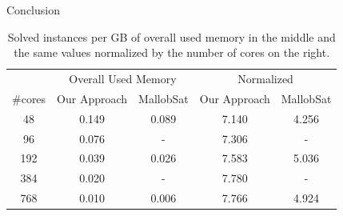 \documentclass{beamer}
\begin{document}
\begin{frame}{Conclusion}
    \begin{table}[scale=.75]
        \center
        \begin{tabular}{ ccccc }
          \toprule
          \multicolumn{1}{c}{} & \multicolumn{2}{c}{Overall Used Memory} & \multicolumn{2}{c}{Normalized}\\
          \#cores & Our Approach & MallobSat & Our Approach & MallobSat \\
          \midrule
          48  & 0.149 & 0.089 & 7.140 & 4.256\\
          96  & 0.076 & -     & 7.306 & -\\
          192 & 0.039 & 0.026 & 7.583 & 5.036\\
          384 & 0.020 & -     & 7.780 & -\\
          768 & 0.010 & 0.006 & 7.766 & 4.924\\
          \bottomrule
        \end{tabular}
        \caption{Solved instances per GB of overall used memory in the middle and the same values normalized by the number of cores on the right.}
    \end{table}
\end{frame}
\end{document}
